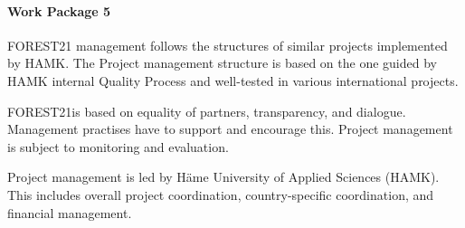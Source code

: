 \documentclass[
  11pt,
]{article}
\begin{document}
\hypertarget{work-package-5}{%
\paragraph{Work Package 5}\label{work-package-5}}

FOREST21 management follows the structures of similar projects
implemented by HAMK. The Project management structure is based on the
one guided by HAMK internal Quality Process and well-tested in various
international projects.

FOREST21is based on equality of partners, transparency, and dialogue.
Management practises have to support and encourage this. Project
management is subject to monitoring and evaluation.

Project management is led by Häme University of Applied Sciences (HAMK).
This includes overall project coordination, country-specific
coordination, and financial management.

\providecommand{\docline}[3]{\noalign{\global\setlength{\arrayrulewidth}{#1}}\arrayrulecolor[HTML]{#2}\cline{#3}}

\setlength{\tabcolsep}{2pt}

\renewcommand*{\arraystretch}{1.5}
\end{document}
